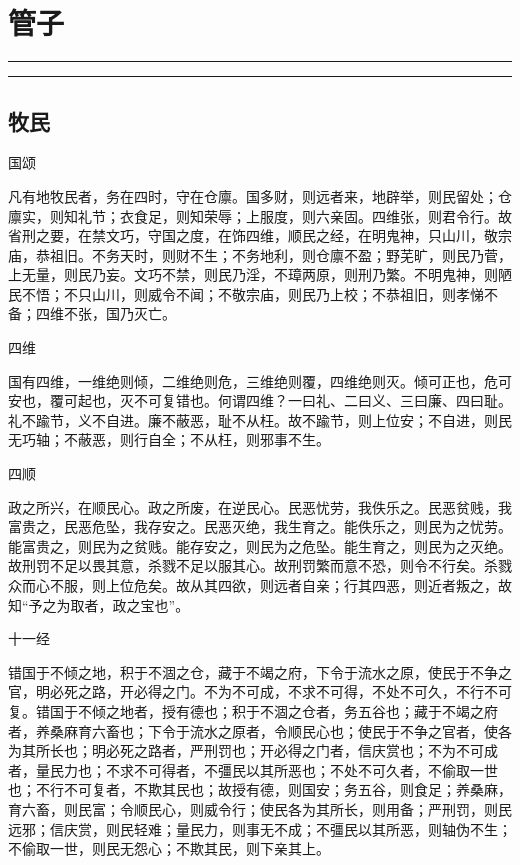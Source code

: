\documentclass[]{article}
\date{}
\begin{document}
\hypertarget{header-n0}{%
\section{管子}\label{header-n0}}

\begin{center}\rule{0.5\linewidth}{\linethickness}\end{center}

\tableofcontents

\begin{center}\rule{0.5\linewidth}{\linethickness}\end{center}

\hypertarget{header-n6}{%
\subsection{牧民}\label{header-n6}}

国颂

凡有地牧民者，务在四时，守在仓廪。国多财，则远者来，地辟举，则民留处；仓廪实，则知礼节；衣食足，则知荣辱；上服度，则六亲固。四维张，则君令行。故省刑之要，在禁文巧，守国之度，在饰四维，顺民之经，在明鬼神，只山川，敬宗庙，恭祖旧。不务天时，则财不生；不务地利，则仓廪不盈；野芜旷，则民乃菅，上无量，则民乃妄。文巧不禁，则民乃淫，不璋两原，则刑乃繁。不明鬼神，则陋民不悟；不只山川，则威令不闻；不敬宗庙，则民乃上校；不恭祖旧，则孝悌不备；四维不张，国乃灭亡。

四维

国有四维，一维绝则倾，二维绝则危，三维绝则覆，四维绝则灭。倾可正也，危可安也，覆可起也，灭不可复错也。何谓四维？一曰礼、二曰义、三曰廉、四曰耻。礼不踰节，义不自进。廉不蔽恶，耻不从枉。故不踰节，则上位安；不自进，则民无巧轴；不蔽恶，则行自全；不从枉，则邪事不生。

四顺

政之所兴，在顺民心。政之所废，在逆民心。民恶忧劳，我佚乐之。民恶贫贱，我富贵之，民恶危坠，我存安之。民恶灭绝，我生育之。能佚乐之，则民为之忧劳。能富贵之，则民为之贫贱。能存安之，则民为之危坠。能生育之，则民为之灭绝。故刑罚不足以畏其意，杀戮不足以服其心。故刑罚繁而意不恐，则令不行矣。杀戮众而心不服，则上位危矣。故从其四欲，则远者自亲；行其四恶，则近者叛之，故知``予之为取者，政之宝也''。

十一经

错国于不倾之地，积于不涸之仓，藏于不竭之府，下令于流水之原，使民于不争之官，明必死之路，开必得之门。不为不可成，不求不可得，不处不可久，不行不可复。错国于不倾之地者，授有德也；积于不涸之仓者，务五谷也；藏于不竭之府者，养桑麻育六畜也；下令于流水之原者，令顺民心也；使民于不争之官者，使各为其所长也；明必死之路者，严刑罚也；开必得之门者，信庆赏也；不为不可成者，量民力也；不求不可得者，不彊民以其所恶也；不处不可久者，不偷取一世也；不行不可复者，不欺其民也；故授有德，则国安；务五谷，则食足；养桑麻，育六畜，则民富；令顺民心，则威令行；使民各为其所长，则用备；严刑罚，则民远邪；信庆赏，则民轻难；量民力，则事无不成；不彊民以其所恶，则轴伪不生；不偷取一世，则民无怨心；不欺其民，则下亲其上。
\end{document}
